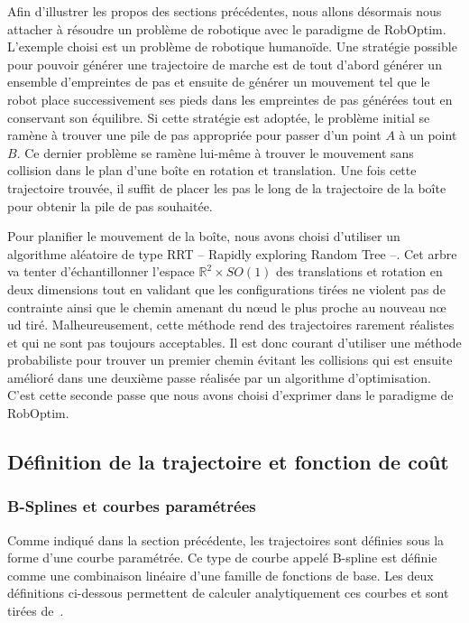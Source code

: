 Afin d'illustrer les propos des sections précédentes, nous allons
désormais nous attacher à résoudre un problème de robotique avec le
paradigme de RobOptim. L'exemple choisi est un problème de robotique
humanoïde. Une stratégie possible pour pouvoir générer une trajectoire
de marche est de tout d'abord générer un ensemble d'empreintes de pas
et ensuite de générer un mouvement tel que le robot place
successivement ses pieds dans les empreintes de pas générées tout en
conservant son équilibre. Si cette stratégie est adoptée, le problème
initial se ramène à trouver une pile de pas appropriée pour passer
d'un point $A$ à un point $B$. Ce dernier problème se ramène lui-même
à trouver le mouvement sans collision dans le plan d'une boîte en
rotation et translation. Une fois cette trajectoire trouvée, il suffit
de placer les pas le long de la trajectoire de la boîte pour obtenir
la pile de pas souhaitée.


Pour planifier le mouvement de la boîte, nous avons choisi d'utiliser
un algorithme aléatoire de type RRT -- Rapidly exploring Random Tree
--. Cet arbre va tenter d'échantillonner l'espace $\mathbb{R}^2 \times
SO(1)$ des translations et rotation en deux dimensions tout en
validant que les configurations tirées ne violent pas de contrainte
ainsi que le chemin amenant du n\oe ud le plus proche au nouveau n\oe
ud tiré. Malheureusement, cette méthode rend des trajectoires rarement
réalistes et qui ne sont pas toujours acceptables. Il est donc courant
d'utiliser une méthode probabiliste pour trouver un premier chemin
évitant les collisions qui est ensuite amélioré dans une deuxième
passe réalisée par un algorithme d'optimisation. C'est cette seconde
passe que nous avons choisi d'exprimer dans le paradigme de RobOptim.


\subsection{Définition de la trajectoire et fonction de coût}
\label{sec:chap1_roboptim_cout}

\subsubsection{B-Splines et courbes paramétrées}
\label{sec:chap1_roboptim_cout_bspline}

Comme indiqué dans la section précédente, les trajectoires sont
définies sous la forme d'une courbe paramétrée. Ce type de courbe
appelé B-spline est définie comme une
combinaison linéaire d'une famille de fonctions de base. Les deux
définitions ci-dessous permettent de calculer analytiquement ces
courbes et sont tirées de \citep{02malgouyres}.

